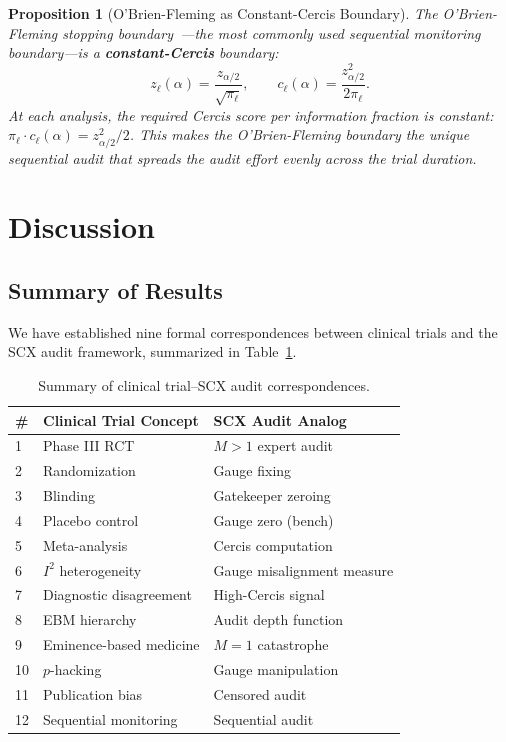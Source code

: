 \documentclass[12pt,a4paper]{article}
\newtheorem{proposition}[theorem]{Proposition}
\theoremstyle{remark}
\newcommand{\SCX}{\textsf{SCX}}
\newcommand{\Cercis}{\textsf{Cercis}}
\begin{document}
\begin{proposition}[O'Brien-Fleming as Constant-Cercis Boundary]
\label{prop:obf}
The O'Brien-Fleming stopping boundary~\cite{obrien1979multiple}---the most
commonly used sequential monitoring boundary---is a \textbf{constant-Cercis}
boundary:
\begin{equation}
  z_{\ell}(\alpha) = \frac{z_{\alpha/2}}{\sqrt{\pi_{\ell}}},
  \qquad
  c_{\ell}(\alpha) = \frac{z_{\alpha/2}^2}{2\pi_{\ell}}.
\end{equation}
At each analysis, the required \Cercis{} score per information fraction is
constant: $\pi_{\ell} \cdot c_{\ell}(\alpha) = z_{\alpha/2}^2/2$. This
makes the O'Brien-Fleming boundary the unique sequential audit that spreads
the audit effort evenly across the trial duration.
\end{proposition}


\section{Discussion}
\label{sec:discussion}

\subsection{Summary of Results}

We have established nine formal correspondences between clinical trials
and the \SCX{} audit framework, summarized in Table~\ref{tab:results}.

\begin{table}[H]
\centering
\caption{Summary of clinical trial--SCX audit correspondences.}
\label{tab:results}
\begin{tabular}{@{}lll@{}}
\toprule
\textbf{\#} & \textbf{Clinical Trial Concept} & \textbf{SCX Audit Analog} \\
\midrule
1 & Phase III RCT & $M>1$ expert audit \\
2 & Randomization & Gauge fixing \\
3 & Blinding & Gatekeeper zeroing \\
4 & Placebo control & Gauge zero (bench) \\
5 & Meta-analysis & Cercis computation \\
6 & $I^2$ heterogeneity & Gauge misalignment measure \\
7 & Diagnostic disagreement & High-Cercis signal \\
8 & EBM hierarchy & Audit depth function \\
9 & Eminence-based medicine & $M=1$ catastrophe \\
10 & $p$-hacking & Gauge manipulation \\
11 & Publication bias & Censored audit \\
12 & Sequential monitoring & Sequential audit \\
\bottomrule
\end{tabular}
\end{table}
\end{document}
